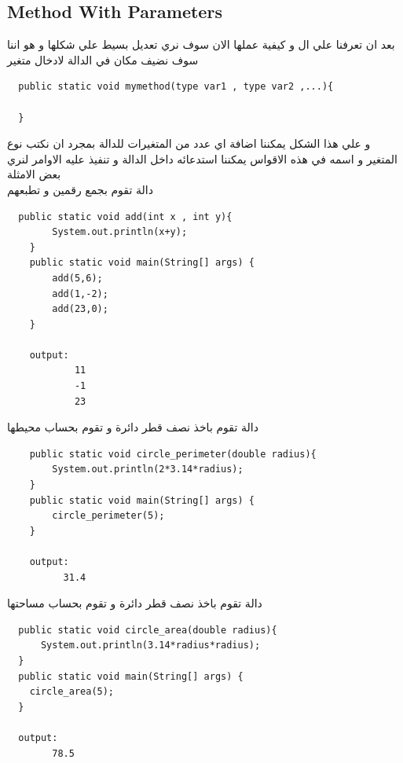 \subsection{Method With Parameters}
\begin{AR}
بعد ان تعرفنا علي ال  و كيفية عملها الان سوف نري تعديل بسيط علي شكلها 
و هو اننا سوف نضيف مكان في الدالة لادخال متغير
\end{AR}
\begin{verbatim}
  public static void mymethod(type var1 , type var2 ,...){
    
  }
\end{verbatim}
\begin{AR}
و علي هذا الشكل يمكننا اضافة اي عدد من المتغيرات للدالة بمجرد ان نكتب نوع المتغير 
و اسمه في هذه الاقواس يمكننا استدعائه داخل الدالة و تنفيذ عليه الاوامر لنري بعض الامثلة 
\\
دالة تقوم بجمع رقمين و تطبعهم 
\end{AR}
\begin{verbatim}
  public static void add(int x , int y){
        System.out.println(x+y);
    }
    public static void main(String[] args) {
        add(5,6);
        add(1,-2);
        add(23,0);
    }

    output:
            11
            -1
            23
\end{verbatim}
\begin{AR}
  دالة تقوم باخذ نصف قطر دائرة و تقوم بحساب محيطها
\end{AR}
\begin{verbatim}
    public static void circle_perimeter(double radius){
        System.out.println(2*3.14*radius);
    }
    public static void main(String[] args) {
        circle_perimeter(5);
    }

    output:
          31.4
\end{verbatim}
\begin{AR}
  دالة تقوم باخذ نصف قطر دائرة و تقوم بحساب مساحتها
\end{AR}
\begin{verbatim}
  public static void circle_area(double radius){
      System.out.println(3.14*radius*radius);
  }
  public static void main(String[] args) {
    circle_area(5);
  }

  output:
        78.5
\end{verbatim}
\newpage
